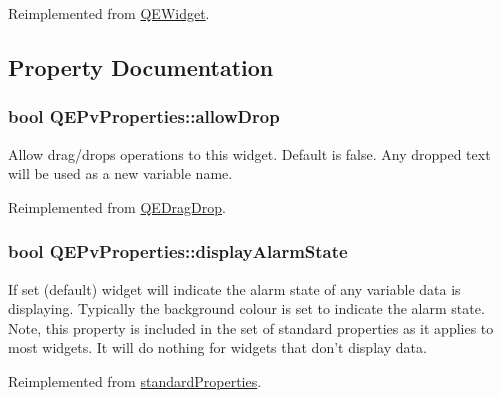 Reimplemented from \hyperlink{classQEWidget_a9ee296007965078d55ddc26ebcc0ef5e}{QEWidget}.



\subsection{Property Documentation}
\hypertarget{classQEPvProperties_af944305bf3dd55015fdf69105b37bdfc}{
\subsubsection[{allowDrop}]{\setlength{\rightskip}{0pt plus 5cm}bool QEPvProperties::allowDrop}}
\label{classQEPvProperties_af944305bf3dd55015fdf69105b37bdfc}
Allow drag/drops operations to this widget. Default is false. Any dropped text will be used as a new variable name. 

Reimplemented from \hyperlink{classQEDragDrop}{QEDragDrop}.

\hypertarget{classQEPvProperties_af2a9e3de8c29577cbd930a0410ce94b3}{
\subsubsection[{displayAlarmState}]{\setlength{\rightskip}{0pt plus 5cm}bool QEPvProperties::displayAlarmState}}
\label{classQEPvProperties_af2a9e3de8c29577cbd930a0410ce94b3}
If set (default) widget will indicate the alarm state of any variable data is displaying. Typically the background colour is set to indicate the alarm state. Note, this property is included in the set of standard properties as it applies to most widgets. It will do nothing for widgets that don't display data. 

Reimplemented from \hyperlink{classstandardProperties}{standardProperties}.

